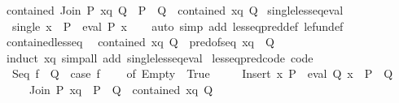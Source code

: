 \begin{isabellebody}
{\isacharbar}{\kern0pt}\ {\isachardoublequoteopen}contained\ {\isacharparenleft}{\kern0pt}Join\ P\ xq{\isacharparenright}{\kern0pt}\ Q\ {\isasymlongleftrightarrow}\ P\ {\isasymle}\ Q\ {\isasymand}\ contained\ xq\ Q{\isachardoublequoteclose}\isanewline
\isanewline
{}\isamarkupfalse%
\ single{\isacharunderscore}{\kern0pt}less{\isacharunderscore}{\kern0pt}eq{\isacharunderscore}{\kern0pt}eval{\isacharcolon}{\kern0pt}\isanewline
\ \ {\isachardoublequoteopen}single\ x\ {\isasymle}\ P\ {\isasymlongleftrightarrow}\ eval\ P\ x{\isachardoublequoteclose}\isanewline
%
\isadelimproof
\ \ %
\endisadelimproof
%
\isatagproof
{}\isamarkupfalse%
\ {\isacharparenleft}{\kern0pt}auto\ simp\ add{\isacharcolon}{\kern0pt}\ less{\isacharunderscore}{\kern0pt}eq{\isacharunderscore}{\kern0pt}pred{\isacharunderscore}{\kern0pt}def\ le{\isacharunderscore}{\kern0pt}fun{\isacharunderscore}{\kern0pt}def{\isacharparenright}{\kern0pt}%
\endisatagproof
{\isafoldproof}%
%
\isadelimproof
\isanewline
%
\endisadelimproof
\isanewline
{}\isamarkupfalse%
\ contained{\isacharunderscore}{\kern0pt}less{\isacharunderscore}{\kern0pt}eq{\isacharcolon}{\kern0pt}\isanewline
\ \ {\isachardoublequoteopen}contained\ xq\ Q\ {\isasymlongleftrightarrow}\ pred{\isacharunderscore}{\kern0pt}of{\isacharunderscore}{\kern0pt}seq\ xq\ {\isasymle}\ Q{\isachardoublequoteclose}\isanewline
%
\isadelimproof
\ \ %
\endisadelimproof
%
\isatagproof
{}\isamarkupfalse%
\ {\isacharparenleft}{\kern0pt}induct\ xq{\isacharparenright}{\kern0pt}\ {\isacharparenleft}{\kern0pt}simp{\isacharunderscore}{\kern0pt}all\ add{\isacharcolon}{\kern0pt}\ single{\isacharunderscore}{\kern0pt}less{\isacharunderscore}{\kern0pt}eq{\isacharunderscore}{\kern0pt}eval{\isacharparenright}{\kern0pt}%
\endisatagproof
{\isafoldproof}%
%
\isadelimproof
\isanewline
%
\endisadelimproof
\isanewline
{}\isamarkupfalse%
\ less{\isacharunderscore}{\kern0pt}eq{\isacharunderscore}{\kern0pt}pred{\isacharunderscore}{\kern0pt}code\ {\isacharbrackleft}{\kern0pt}code{\isacharbrackright}{\kern0pt}{\isacharcolon}{\kern0pt}\isanewline
\ \ {\isachardoublequoteopen}Seq\ f\ {\isasymle}\ Q\ {\isacharequal}{\kern0pt}\ {\isacharparenleft}{\kern0pt}case\ f\ {\isacharparenleft}{\kern0pt}{\isacharparenright}{\kern0pt}\isanewline
\ \ \ of\ Empty\ {\isasymRightarrow}\ True\isanewline
\ \ \ \ {\isacharbar}{\kern0pt}\ Insert\ x\ P\ {\isasymRightarrow}\ eval\ Q\ x\ {\isasymand}\ P\ {\isasymle}\ Q\isanewline
\ \ \ \ {\isacharbar}{\kern0pt}\ Join\ P\ xq\ {\isasymRightarrow}\ P\ {\isasymle}\ Q\ {\isasymand}\ contained\ xq\ Q{\isacharparenright}{\kern0pt}{\isachardoublequoteclose}\isanewline

\end{isabellebody}
